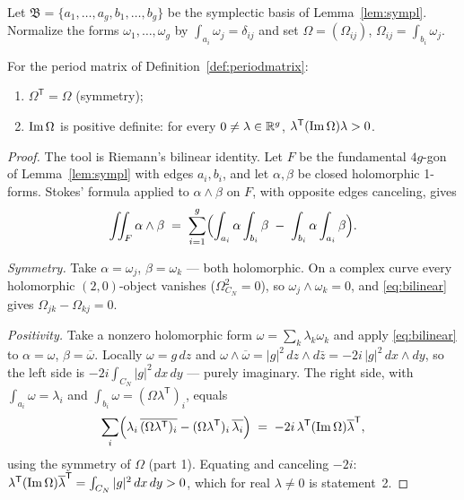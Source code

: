 \begin{definition}\label{def:periodmatrix}
Let $\mathfrak{B}=\{a_1,\dots,a_g,b_1,\dots,b_g\}$ be the symplectic
basis of Lemma~\ref{lem:sympl}. Normalize the forms
$\omega_1,\dots,\omega_g$ by $\int_{a_i}\omega_j=\delta_{ij}$ and set
$\Omega=(\Omega_{ij})$, $\Omega_{ij}=\int_{b_i}\omega_j$.
\end{definition}

\begin{theorem}\label{th:riemann}
For the period matrix of Definition~\ref{def:periodmatrix}:
\begin{enumerate}[leftmargin=2em, itemsep=0.15em]
\item $\Omega^{\mathsf{T}}=\Omega$ (symmetry);
\item $\operatorname{Im}\Omega$ is positive definite: for every
  $0\ne\lambda\in\mathbb{R}^g$, $\lambda^{\mathsf{T}}(\operatorname{Im}\Omega)\lambda>0$.
\end{enumerate}
\end{theorem}

\begin{proof}
The tool is Riemann's bilinear identity. Let $F$ be the fundamental
$4g$-gon of Lemma~\ref{lem:sympl} with edges $a_i,b_i$, and let
$\alpha,\beta$ be closed holomorphic 1-forms. Stokes' formula
applied to $\alpha\wedge\beta$ on $F$, with opposite edges
canceling, gives
\begin{equation}\label{eq:bilinear}
  \iint_F \alpha\wedge\beta
  \;=\;\sum_{i=1}^{g}\Bigl(
    \int_{a_i}\alpha\int_{b_i}\beta
    \;-\;\int_{b_i}\alpha\int_{a_i}\beta\Bigr).
\end{equation}

\emph{Symmetry.} Take $\alpha=\omega_j$, $\beta=\omega_k$ --- both
holomorphic. On a complex curve every holomorphic $(2,0)$-object
vanishes ($\Omega^2_{C_N}=0$), so $\omega_j\wedge\omega_k=0$, and
\eqref{eq:bilinear} gives
$\Omega_{jk}-\Omega_{kj}=0$.

\emph{Positivity.} Take a nonzero holomorphic form
$\omega=\sum_k\lambda_k\omega_k$ and apply \eqref{eq:bilinear} to
$\alpha=\omega$, $\beta=\overline{\omega}$. Locally
$\omega=g\,dz$ and $\omega\wedge\overline{\omega}
=|g|^2\,dz\wedge d\bar z=-2i\,|g|^2\,dx\wedge dy$, so the left side
is $-2i\int_{C_N}|g|^2\,dx\,dy$ --- purely imaginary. The right side,
with $\int_{a_i}\omega=\lambda_i$ and
$\int_{b_i}\omega=(\Omega\lambda^{\mathsf{T}})_i$, equals
\[
  \sum_i\Bigl(\lambda_i\,\overline{(\Omega\lambda^{\mathsf{T}})_i}
  -(\Omega\lambda^{\mathsf{T}})_i\,\overline{\lambda_i}\Bigr)
  \;=\;-2i\,\lambda^{\mathsf{T}}(\operatorname{Im}\Omega)\overline{\lambda}^{\mathsf{T}},
\]
using the symmetry of $\Omega$ (part 1). Equating and canceling
$-2i$:
$\lambda^{\mathsf{T}}(\operatorname{Im}\Omega)\overline{\lambda}^{\mathsf{T}}
=\int_{C_N}|g|^2\,dx\,dy>0$, which for real $\lambda\ne0$ is
statement~2.
\end{proof}

